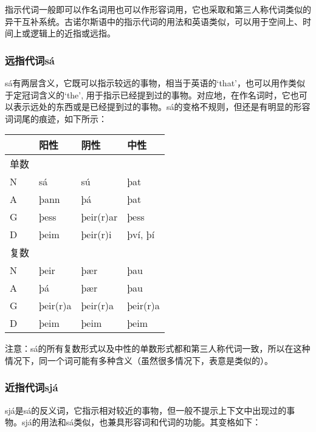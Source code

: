 \begin{introduction}[章节要点]
指示代词一般即可以作名词用也可以作形容词用，它也采取和第三人称代词类似的异干互补系统。古诺尔斯语中的指示代词的用法和英语类似，可以用于空间上、时间上或逻辑上的近指或远指。

\subsubsection{远指代词sá}

sá有两层含义，它既可以指示较远的事物，相当于英语的`that‌'，也可以用作类似于定冠词含义的`the‌',
用于指示已经提到过的事物。对应地，在作名词时，它也可以表示远处的东西或是已经提到过的事物。sá的变格不规则，但还是有明显的形容词词尾的痕迹，如下所示：

\begin{longtable}{llll}
    \toprule
         & 阳性     & 阴性      & 中性     \\
    \midrule
    \endhead
    \bottomrule
    \endfoot
    单数 &          &           &          \\
    N    & sá       & sú        & þat      \\
    A    & þann     & þá        & þat      \\
    G    & þess     & þeir(r)ar & þess     \\
    D    & þeim     & þeir(r)i  & því, þí  \\
    复数 &          &           &          \\
    N    & þeir     & þær       & þau      \\
    A    & þá       & þær       & þau      \\
    G    & þeir(r)a & þeir(r)a  & þeir(r)a \\
    D    & þeim     & þeim      & þeim     \\
\end{longtable}

注意：sá的所有复数形式以及中性的单数形式都和第三人称代词一致，所以在这种情况下，同一个词可能有多种含义（虽然很多情况下，表意是类似的）。

\subsubsection{近指代词sjá}

sjá是sá的反义词，它指示相对较近的事物，但一般不提示上下文中出现过的事物。sjá的用法和sá类似，也兼具形容词和代词的功能。其变格如下：


\end{introduction}

